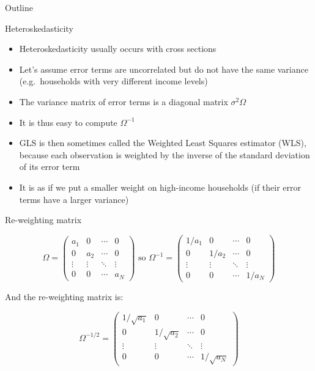 \documentclass[aspectratio=169]{beamer}
\begin{document}
\begin{frame}{Outline}
\tableofcontents[currentsection]
\end{frame}

\begin{frame}{Heteroskedasticity}

\begin{itemize}
    \item Heteroskedasticity usually occurs with cross sections
    \item Let's assume error terms are uncorrelated but do not have the same variance (e.g.\ households with very different income levels)
    \item The variance matrix of error terms is a diagonal matrix $\sigma^2\Omega$
    \item It is thus easy to compute $\Omega^{-1}$
    \item GLS is then sometimes called the Weighted Least Squares estimator (WLS), because each observation is weighted by the inverse of the standard deviation of its error term
    \item It is as if we put a smaller weight on high-income households (if their error terms have a larger variance)
\end{itemize}

\end{frame}

\begin{frame}{Re-weighting matrix}

\[
\Omega = \begin{pmatrix}
a_1 & 0 & \cdots & 0\\
0 & a_2 & \cdots & 0\\
\vdots & \vdots & \ddots & \vdots\\
0 & 0 & \cdots & a_N
\end{pmatrix}
\text{ so } \Omega^{-1} = \begin{pmatrix}
1/a_1 & 0 & \cdots & 0\\
0 & 1/a_2 & \cdots & 0\\
\vdots & \vdots & \ddots & \vdots\\
0 & 0 & \cdots & 1/a_N
\end{pmatrix}
\]

And the re-weighting matrix is:

\[
\Omega^{-1/2} = \begin{pmatrix}
1/\sqrt{a_1} & 0 & \cdots & 0\\
0 & 1/\sqrt{a_2} & \cdots & 0\\
\vdots & \vdots & \ddots & \vdots\\
0 & 0 & \cdots & 1/\sqrt{a_N}
\end{pmatrix}
\]

\end{frame}
\end{document}
